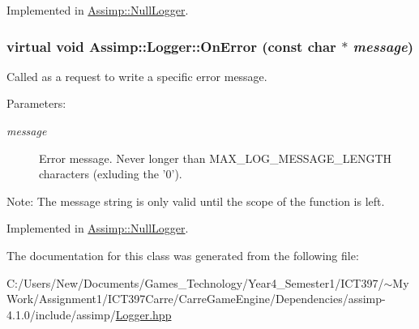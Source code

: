 Implemented in \hyperlink{class_assimp_1_1_null_logger_9a04c2b9e3d4bc9eec8f693ed8115f24}{Assimp::NullLogger}.\hypertarget{class_assimp_1_1_logger_e2ea0790aba6125b90af0f2768b0759d}{
\subsubsection[OnError]{\setlength{\rightskip}{0pt plus 5cm}virtual void Assimp::Logger::OnError (const char $\ast$ {\em message})}}
\label{class_assimp_1_1_logger_e2ea0790aba6125b90af0f2768b0759d}


Called as a request to write a specific error message. 

\begin{Desc}
\item[Parameters:]
\begin{description}
\item[{\em message}]Error message. Never longer than MAX\_\-LOG\_\-MESSAGE\_\-LENGTH characters (exluding the '0'). \end{description}
\end{Desc}
\begin{Desc}
\item[Note:]The message string is only valid until the scope of the function is left. \end{Desc}


Implemented in \hyperlink{class_assimp_1_1_null_logger_4fbf66103757fafcff891fb04b4ee714}{Assimp::NullLogger}.

The documentation for this class was generated from the following file:\begin{CompactItemize}
\item 
C:/Users/New/Documents/Games\_\-Technology/Year4\_\-Semester1/ICT397/$\sim$My Work/Assignment1/ICT397Carre/CarreGameEngine/Dependencies/assimp-4.1.0/include/assimp/\hyperlink{_logger_8hpp}{Logger.hpp}\end{CompactItemize}
